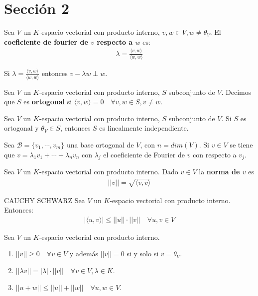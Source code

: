 \section{Sección 2}
\begin{definition}{}{}
    Sea $V$ un $K$-espacio vectorial con producto interno, $v,w \in V, w \neq \theta_V$. El \textbf{coeficiente de fourier de $v$ respecto a $w$} es:
    \begin{align*}
        \lambda = \frac{\langle v,w \rangle}{\langle w,w \rangle}
    \end{align*}
\end{definition}
\begin{obs}{}{}
    Si $\lambda = \frac{\langle v,w \rangle}{\langle w,w \rangle}$ entonces $v - \lambda w \perp w$.
\end{obs}
\begin{definition}{}{}
    Sea $V$ un $K$-espacio vectorial con producto interno, $S$ subconjunto de $V$. Decimos que $S$ es \textbf{ortogonal} si $\langle v, w \rangle = 0 \quad \forall v,w \in S, v \neq w$.
\end{definition}
\begin{proposition}{}{}
    Sea $V$ un $K$-espacio vectorial con producto interno, $S$ subconjunto de $V$. Si $S$ es ortogonal y $\theta_V \in S$, entonces $S$ es linealmente independiente.
\end{proposition}
\begin{obs}{}{}
    Sea $\mathcal{B} = \{v_1, \cdots, v_m\}$ una base ortogonal de $V$, con $n = dim(V)$. Si $ v \in V$ se tiene que $v = \lambda_1 v_1 + \cdots + \lambda_n v_n$ con $\lambda_j$ el coeficiente de Fourier de $v$ con respecto a $v_j$.
\end{obs}
\begin{definition}{}{}
    Sea $V$ un $K$-espacio vectorial con producto interno. Dado $v \in V$ la \textbf{norma de $v$} es 
    \begin{align*}
        ||v|| = \sqrt{\langle v,v \rangle}
    \end{align*}
\end{definition}
\begin{lemma}{CAUCHY SCHWARZ}{}
    Sea $V$ un $K$-espacio vectorial con producto interno. Entonces:
    \begin{align*}
        |\langle u,v \rangle| \leq ||u|| \cdot ||v|| \quad \forall u,v \in V
    \end{align*}
\end{lemma}
\begin{proposition}{}{}
    Sea $V$ un $K$-espacio vectorial con producto interno.
    \begin{enumerate}
        \item $||v|| \geq 0 \quad \forall v \in V$ y además $||v|| = 0$ si y solo si $v = \theta_V$.
        \item $||\lambda v|| = |\lambda| \cdot ||v|| \quad \forall v \in V, \lambda \in K$.
        \item $||u+w|| \leq ||u|| + ||w|| \quad \forall u,w \in V$.
    \end{enumerate}
\end{proposition}
